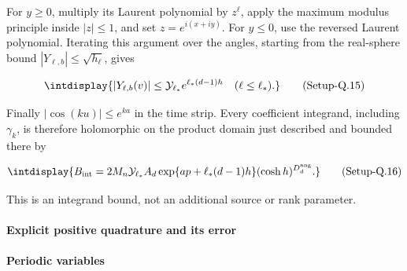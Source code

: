 
For \(y\ge0\), multiply its Laurent polynomial by \(z^\ell\), apply the maximum modulus principle inside \(|z|\le1\), and set \(z=e^{i(x+iy)}\). For \(y\le0\), use the reversed Laurent polynomial. Iterating this argument over the angles, starting from the real-sphere bound \(|Y_{\ell,\allowbreak b}|\le\sqrt{h_\ell}\), gives


\label{int:eq-setup-q-15}
\begingroup\renewcommand{\theHequation}{intdisplay.883}
\begin{equation}
\intdisplay{
|Y_{\ell,b}(v)|\le\mathcal Y_{\ell_*} e^{\ell_*(d-1)h}
\quad(\ell\le \ell_*).
}
\tag{Setup-Q.15}
\label{int:eq-0436-setup-q-15}
\end{equation}
\endgroup


Finally \(|\cos(ku)|\le e^{ka}\) in the time strip. Every coefficient integrand, including \(\gamma_k\), is therefore holomorphic on the product domain just described and bounded there by


\label{int:eq-setup-q-16}
\begingroup\renewcommand{\theHequation}{intdisplay.884}
\begin{equation}
\intdisplay{
B_{\rm int}=
2M_n\mathcal Y_{\ell_*} A_d
\exp\{ap+\ell_*(d-1)h\}(\cosh h)^{D_d^{\rm ang}}.
}
\tag{Setup-Q.16}
\label{int:eq-0437-setup-q-16}
\end{equation}
\endgroup


This is an integrand bound, not an additional source or rank parameter.


\paragraph{Explicit positive quadrature and its error}
\label{int:setup-quadrature-3}
\mbox{}\par\smallskip

\paragraph{Periodic variables}

\mbox{}\par\smallskip


